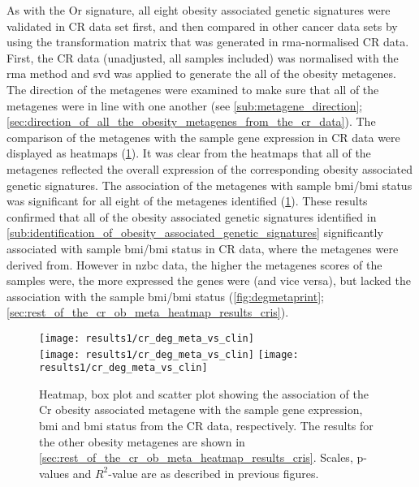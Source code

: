 As with the Or signature, all eight obesity associated genetic signatures were validated in CR data set first, and then compared in other cancer data sets by using the transformation matrix that was generated in \gls{rma}-normalised CR data.
First, the CR data (unadjusted, all samples included) was normalised with the \gls{rma} method and \gls{svd} was applied to generate the all of the obesity metagenes.
The direction of the metagenes were examined to make sure that all of the metagenes were in line with one another (see \cref{sub:metagene_direction}; \cref{sec:direction_of_all_the_obesity_metagenes_from_the_cr_data}).
The comparison of the metagenes with the sample gene expression in CR data were displayed as heatmaps (\cref{fig:degmetacr}).
It was clear from the heatmaps that all of the metagenes reflected the overall expression of the corresponding obesity associated genetic signatures.
The association of the metagenes with sample \gls{bmi}/\gls{bmi} status was significant for all eight of the metagenes identified (\cref{fig:degmetacr}).
These results confirmed that all of the obesity associated genetic signatures identified in \cref{sub:identification_of_obesity_associated_genetic_signatures} significantly associated with sample \gls{bmi}/\gls{bmi} status in CR data, where the metagenes were derived from.
However in \gls{nzbc} data, the higher the metagenes scores of the samples were, the more expressed the genes were (and vice versa), but lacked the association with the sample \gls{bmi}/\gls{bmi} status (\cref{fig:degmetaprint}; \cref{sec:rest_of_the_cr_ob_meta_heatmap_results_cris}).

\begin{figure}[htp!]
	\centering
	\texttt{[image: results1/cr\_deg\_meta\_vs\_clin]}\\
	\vspace{1em}
	\texttt{[image: results1/cr\_deg\_meta\_vs\_clin]}
	\hfill
	\texttt{[image: results1/cr\_deg\_meta\_vs\_clin]}
	\caption[Cr obesity metagene in the CR data]{Heatmap, box plot and scatter plot showing the association of the Cr obesity associated metagene with the sample gene expression, \gls{bmi} and \gls{bmi} status from the CR data, respectively.
	The results for the other obesity metagenes are shown in \cref{sec:rest_of_the_cr_ob_meta_heatmap_results_cris}.
	Scales, p-values and $R^2$-value are as described in previous figures.}
	\label{fig:degmetacr}
\end{figure}

